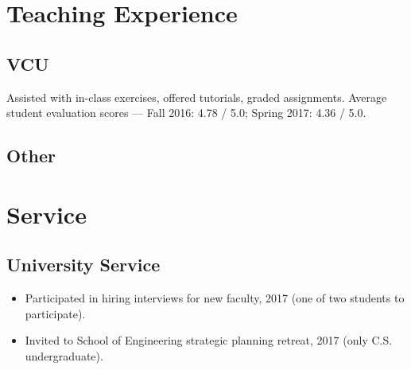 \documentclass[11pt,letterpaper,serif]{moderncv}
\begin{document}
\section{Teaching Experience}
\subsection{VCU}
{
	\begin{adjustwidth}{.25in}{}
		Assisted with in-class exercises, offered tutorials, graded assignments. \newline
		Average student evaluation scores --- Fall 2016: 4.78 / 5.0; Spring 2017: 4.36 / 5.0.
	\end{adjustwidth}
}



\subsection{Other}


\section{Service}
\subsection{University Service}
{
	\begin{adjustwidth}{.25in}{}
		\begin{itemize}%
			\item Participated in hiring interviews for new faculty, 2017 (one of two students to participate).
			\item Invited to School of Engineering strategic planning retreat, 2017 (only C.S. undergraduate).
		\end{itemize}
	\end{adjustwidth}
}
\end{document}

